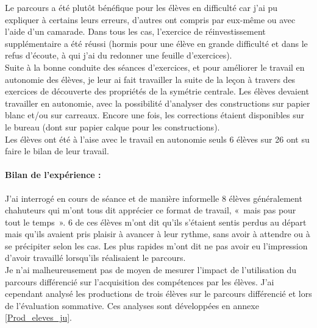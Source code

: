 Le parcours a été plutôt bénéfique pour les élèves en difficulté car j'ai pu expliquer à certains leurs erreurs, d'autres ont compris par eux-même ou avec l'aide d'un camarade. Dans tous les cas, l'exercice de réinvestissement supplémentaire a été réussi (hormis pour une élève en grande difficulté et dans le refus d'écoute, à qui j'ai du redonner une feuille d'exercices).\\
Suite à la bonne conduite des séances d'exercices, et pour améliorer le travail en autonomie des élèves, je leur ai fait travailler la suite de la leçon à travers des exercices de découverte des propriétés de la symétrie centrale. Les élèves devaient travailler en autonomie, avec la possibilité d'analyser des constructions sur papier blanc et/ou sur carreaux. Encore une fois, les corrections étaient disponibles sur le bureau (dont sur papier calque pour les constructions).\\
Les élèves ont été à l'aise avec le travail en autonomie seuls 6 élèves sur 26 ont su faire le bilan de leur travail.

\paragraph{Bilan de l'expérience :}J'ai interrogé en cours de séance et de manière informelle 8 élèves généralement chahuteurs qui m'ont tous dit apprécier ce format de travail, « mais pas pour tout le temps ». 6 de ces élèves m'ont dit qu'ils s'étaient sentis perdus au départ mais qu'ils avaient pris plaisir à avancer à leur rythme, sans avoir  à attendre ou à se précipiter selon les cas. Les plus rapides m'ont dit ne pas avoir eu l'impression d'avoir travaillé lorsqu'ils réalisaient le parcours.\\
Je n'ai malheureusement pas de moyen de mesurer l'impact de l'utilisation du parcours différencié sur l'acquisition des compétences par les élèves. J'ai cependant analysé les productions de trois élèves sur le parcours différencié et lors de l'évaluation sommative. Ces analyses sont développées en annexe \ref{Prod_eleves_ju}.

